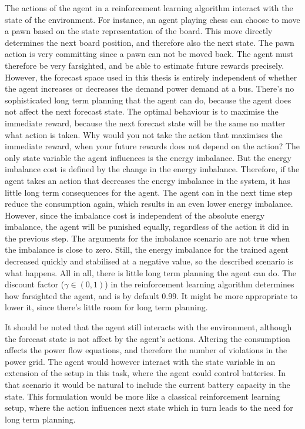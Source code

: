 \documentclass[class=book, crop=false, 11pt]{standalone}
\begin{document}
The actions of the agent in a reinforcement learning algorithm interact with the state of the environment. For instance, an agent playing chess can choose to move a pawn based on the state representation of the board. This move directly determines the next board position, and therefore also the next state. The pawn action is very committing since a pawn can not be moved back. The agent must therefore be very farsighted, and be able to estimate future rewards precisely. However, the forecast space used in this thesis is entirely independent of whether the agent increases or decreases the demand power demand at a bus. There's no sophisticated long term planning that the agent can do, because the agent does not affect the next forecast state. The optimal behaviour is to maximise the immediate reward, because the next forecast state will be the same no matter what action is taken. Why would you not take the action that maximises the immediate reward, when your future rewards does not depend on the action? The only state variable the agent influences is the energy imbalance. But the energy imbalance cost is defined by the change in the energy imbalance. Therefore, if the agent takes an action that decreases the energy imbalance in the system, it has little long term consequences for the agent. The agent can in the next time step reduce the consumption again, which results in an even lower energy imbalance. However, since the imbalance cost is independent of the absolute energy imbalance, the agent will be punished equally, regardless of the action it did in the previous step. The arguments for the imbalance scenario are not true when the imbalance is close to zero. Still, the energy imbalance for the trained agent decreased quickly and stabilised at a negative value, so the described scenario is what happens. All in all, there is little long term planning the agent can do. The discount factor ($\gamma \in (0,1)$) in the reinforcement learning algorithm determines how farsighted the agent, and is by default 0.99. It might be more appropriate to lower it, since there's little room for long term planning.  

It should be noted that the agent still interacts with the environment, although the forecast state is not affect by the agent's actions. Altering the consumption affects the power flow equations, and therefore the number of violations in the power grid. 
The agent would however interact with the state variable in an extension of the setup in this task, where the agent could control batteries. In that scenario it would be natural to include the current battery capacity in the state. This formulation would be more like a classical reinforcement learning setup, where the action influences next state which in turn leads to the need for long term planning.
\end{document}
